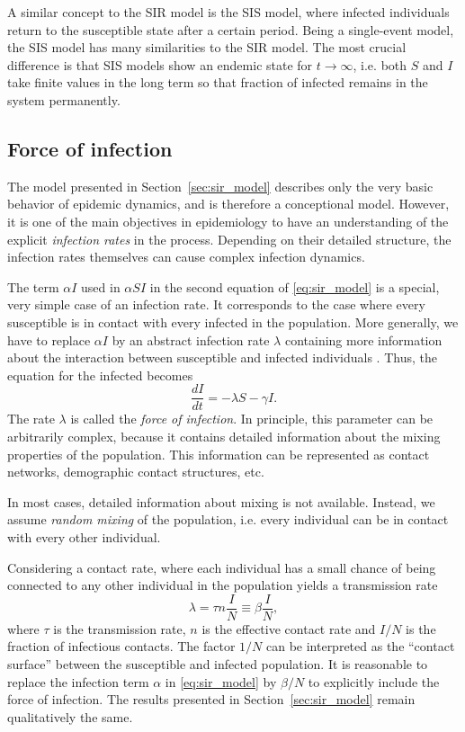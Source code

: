 A similar concept to the SIR model is the SIS model, where infected individuals return to the susceptible state after a certain period.
Being a single-event model, the SIS model has many similarities to the SIR model.
The most crucial difference is that SIS models show an endemic state for $t\rightarrow \infty $, i.e. both $S$ and $I$ take finite values in the long term so that fraction of infected remains in the system permanently.

\subsection{Force of infection}\label{sec:force_of_infection}
The model presented in Section~\ref{sec:sir_model} describes only the very basic behavior of epidemic dynamics, and is therefore a conceptional model.
However, it is one of the main objectives in epidemiology to have an understanding of the explicit \emph{infection rates} in the process.
Depending on their detailed structure, the infection rates themselves can cause complex infection dynamics.

The term $\alpha I$ used in $\alpha S I$ in the second equation of \eqref{eq:sir_model} is a special, very simple case of an infection rate.
It corresponds to the case where every susceptible is in contact with every infected in the population.
More generally, we have to replace $\alpha I$ by an abstract infection rate $\lambda $ containing more information about the interaction between susceptible and infected individuals \citep{Keeling:2005}.
Thus, the equation for the infected becomes
\[
\frac{dI}{dt} = -\lambda S -\gamma I.
\]
The rate $\lambda $ is called the \emph{force of infection}.
In principle, this parameter can be arbitrarily complex, because it contains detailed information about the mixing properties of the population.
This information can be represented as contact networks, demographic contact structures, etc.

In most cases, detailed information about mixing is not available.
Instead, we assume \emph{random mixing} of the population, i.e. every individual can be in contact with every other individual.

Considering a contact rate, where each individual has a small chance of being connected to any other individual in the population yields a transmission rate \citep{Keeling:2005}
\begin{equation}\label{eq:force_of_infection}
\lambda = \tau n \frac{I}{N}\equiv \beta \frac{I}{N},
\end{equation}
where $\tau $ is the transmission rate, $n$ is the effective contact rate and $I/N$ is the fraction of infectious contacts.
The factor $1/N$ can be interpreted as the ``contact surface'' between the susceptible and infected population.
It is reasonable to replace the infection term $\alpha $ in \eqref{eq:sir_model} by $\beta /N$ to explicitly include the force of infection.
The results presented in Section~\ref{sec:sir_model} remain qualitatively the same.

